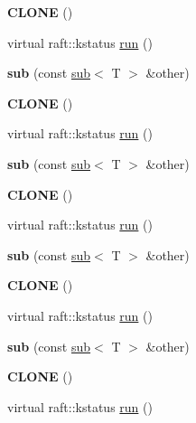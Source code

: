 \begin{DoxyCompactItemize}
\item 
\hypertarget{classsub_ae51496c5801b301aa89045d58c7d5f24}{}\label{classsub_ae51496c5801b301aa89045d58c7d5f24} 
{\bfseries C\+L\+O\+NE} ()
\item 
virtual raft\+::kstatus \hyperlink{classsub_a0a0c7461433ee8b5f4b24305282bf69a}{run} ()
\item 
\hypertarget{classsub_a4ac64767baaddc87027b262dac5528e0}{}\label{classsub_a4ac64767baaddc87027b262dac5528e0} 
{\bfseries sub} (const \hyperlink{classsub}{sub}$<$ T $>$ \&other)
\item 
\hypertarget{classsub_ae51496c5801b301aa89045d58c7d5f24}{}\label{classsub_ae51496c5801b301aa89045d58c7d5f24} 
{\bfseries C\+L\+O\+NE} ()
\item 
virtual raft\+::kstatus \hyperlink{classsub_a0a0c7461433ee8b5f4b24305282bf69a}{run} ()
\item 
\hypertarget{classsub_a4ac64767baaddc87027b262dac5528e0}{}\label{classsub_a4ac64767baaddc87027b262dac5528e0} 
{\bfseries sub} (const \hyperlink{classsub}{sub}$<$ T $>$ \&other)
\item 
\hypertarget{classsub_ae51496c5801b301aa89045d58c7d5f24}{}\label{classsub_ae51496c5801b301aa89045d58c7d5f24} 
{\bfseries C\+L\+O\+NE} ()
\item 
virtual raft\+::kstatus \hyperlink{classsub_a0a0c7461433ee8b5f4b24305282bf69a}{run} ()
\item 
\hypertarget{classsub_a4ac64767baaddc87027b262dac5528e0}{}\label{classsub_a4ac64767baaddc87027b262dac5528e0} 
{\bfseries sub} (const \hyperlink{classsub}{sub}$<$ T $>$ \&other)
\item 
\hypertarget{classsub_ae51496c5801b301aa89045d58c7d5f24}{}\label{classsub_ae51496c5801b301aa89045d58c7d5f24} 
{\bfseries C\+L\+O\+NE} ()
\item 
virtual raft\+::kstatus \hyperlink{classsub_a0a0c7461433ee8b5f4b24305282bf69a}{run} ()
\item 
\hypertarget{classsub_a4ac64767baaddc87027b262dac5528e0}{}\label{classsub_a4ac64767baaddc87027b262dac5528e0} 
{\bfseries sub} (const \hyperlink{classsub}{sub}$<$ T $>$ \&other)
\item 
\hypertarget{classsub_ae51496c5801b301aa89045d58c7d5f24}{}\label{classsub_ae51496c5801b301aa89045d58c7d5f24} 
{\bfseries C\+L\+O\+NE} ()
\item 
virtual raft\+::kstatus \hyperlink{classsub_a0a0c7461433ee8b5f4b24305282bf69a}{run} ()
\item 
\hypertarget{classsub_a4ac64767baaddc87027b262dac5528e0}{}\label{classsub_a4ac64767baaddc87027b262dac5528e0} 

\end{DoxyCompactItemize}
